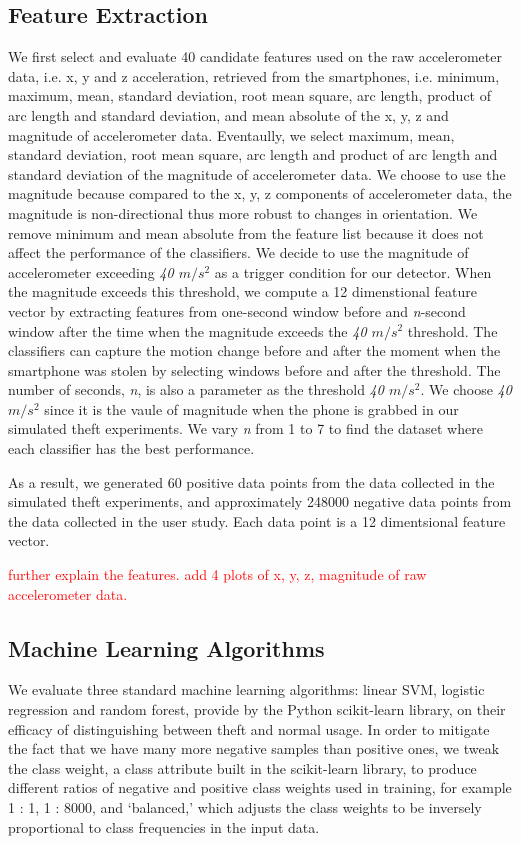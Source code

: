 \documentclass{soups}
\begin{document}
\subsection{Feature Extraction}
We first select and evaluate 40 candidate features used on the raw accelerometer data, i.e. x, y and z acceleration, retrieved from the smartphones, i.e. minimum, maximum, mean, standard deviation, root mean square, arc length, product of arc length and standard deviation, and mean absolute of the x, y, z and magnitude of accelerometer data. Eventaully, we select maximum, mean, standard deviation, root mean square, arc length and product of arc length and standard deviation of the magnitude of accelerometer data. We choose to use the magnitude because compared to the x, y, z components of accelerometer data, the magnitude is non-directional thus more robust to changes in orientation. We remove minimum and mean absolute from the feature list because it does not affect the performance of the classifiers. We decide to use the magnitude of accelerometer exceeding \textit{40 $m/s^2$} as a trigger condition for our detector. When the magnitude exceeds this threshold, we compute a 12 dimenstional feature vector by extracting features from one-second window before and \textit{n}-second window after the time when the magnitude exceeds the \textit{40 $m/s^2$} threshold. The classifiers can capture the motion change before and after the moment when the smartphone was stolen by selecting windows before and after the threshold. The number of seconds, \textit{n}, is also a parameter as the threshold \textit{40 $m/s^2$}. We choose \textit{40 $m/s^2$} since it is the vaule of magnitude when the phone is grabbed in our simulated theft experiments. We vary \textit{n} from 1 to 7 to find the dataset where each classifier has the best performance.

As a result, we generated 60 positive data points from the data collected in the simulated theft experiments, and approximately 248000 negative data points from the data collected in the user study. Each data point is a 12 dimentsional feature vector.

\textcolor{red}{further explain the features. }
\textcolor{red}{add 4 plots of x, y, z, magnitude of raw accelerometer data. }



\subsection{Machine Learning Algorithms}
We evaluate three standard machine learning algorithms: linear SVM, logistic regression and random forest, provide by the Python scikit-learn library, on their efficacy of distinguishing between theft and normal usage. In order to mitigate the fact that we have many more negative samples than positive ones, we tweak the class weight, a class attribute built in the scikit-learn library, to produce different ratios of negative and positive class weights used in training, for example 1 : 1, 1 : 8000, and `balanced,' which adjusts the class weights to be inversely proportional to class frequencies in the input data.
\end{document}
